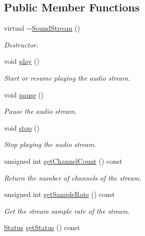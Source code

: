 \subsection*{Public Member Functions}
\begin{DoxyCompactItemize}
\item 
virtual \mbox{\hyperlink{classsf_1_1_sound_stream_a1fafb9f1ca572d23d7d6a17921860d85}{$\sim$\+Sound\+Stream}} ()
\begin{DoxyCompactList}\small\item\em Destructor. \end{DoxyCompactList}\item 
void \mbox{\hyperlink{classsf_1_1_sound_stream_afdc08b69cab5f243d9324940a85a1144}{play}} ()
\begin{DoxyCompactList}\small\item\em Start or resume playing the audio stream. \end{DoxyCompactList}\item 
void \mbox{\hyperlink{classsf_1_1_sound_stream_a932ff181e661503cad288b4bb6fe45ca}{pause}} ()
\begin{DoxyCompactList}\small\item\em Pause the audio stream. \end{DoxyCompactList}\item 
void \mbox{\hyperlink{classsf_1_1_sound_stream_a16cc6a0404b32e42c4dce184bb94d0f4}{stop}} ()
\begin{DoxyCompactList}\small\item\em Stop playing the audio stream. \end{DoxyCompactList}\item 
unsigned int \mbox{\hyperlink{classsf_1_1_sound_stream_a1f70933912dd9498f4dc99feefed27f3}{get\+Channel\+Count}} () const
\begin{DoxyCompactList}\small\item\em Return the number of channels of the stream. \end{DoxyCompactList}\item 
unsigned int \mbox{\hyperlink{classsf_1_1_sound_stream_a7da448dc40d81a33b8dc555fbf0d3fbf}{get\+Sample\+Rate}} () const
\begin{DoxyCompactList}\small\item\em Get the stream sample rate of the stream. \end{DoxyCompactList}\item 
\mbox{\hyperlink{classsf_1_1_sound_source_ac43af72c98c077500b239bc75b812f03}{Status}} \mbox{\hyperlink{classsf_1_1_sound_stream_a64a8193ed728da37c115c65de015849f}{get\+Status}} () const

\end{DoxyCompactItemize}
